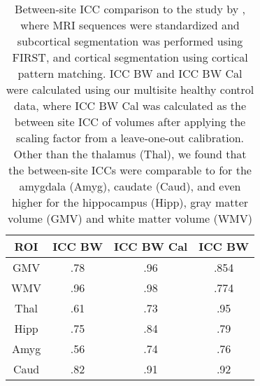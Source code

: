 \begin{table} 
\centering
    \begin{tabular}{ c c c c }
        ROI & ICC BW & ICC BW Cal & \cite{cannon2014} ICC BW \\ 
        \midrule
        GMV & .78 & .96 & .854 \\ 
        WMV & .96 & .98 & .774 \\ 
        Thal & .61 & .73 & .95 \\ 
        Hipp & .75 & .84 & .79 \\ 
        Amyg & .56 & .74 & .76 \\ 
        Caud & .82 & .91 & .92 \\ 
        \bottomrule
    \end{tabular} 
    \caption{Between-site ICC comparison to the study by \cite{cannon2014}, where MRI sequences were standardized and subcortical segmentation was performed using FIRST, and cortical segmentation using cortical pattern matching. ICC BW and ICC BW Cal were calculated using our multisite healthy control data, where ICC BW Cal was calculated as the between site ICC of volumes after applying the scaling factor from a leave-one-out calibration. Other than the thalamus (Thal), we found that the between-site ICCs were comparable to \cite{cannon2014} for the amygdala (Amyg), caudate (Caud), and even higher for the hippocampus (Hipp), gray matter volume (GMV) and white matter volume (WMV)} 
\label{comparetocannon}
\end{table}